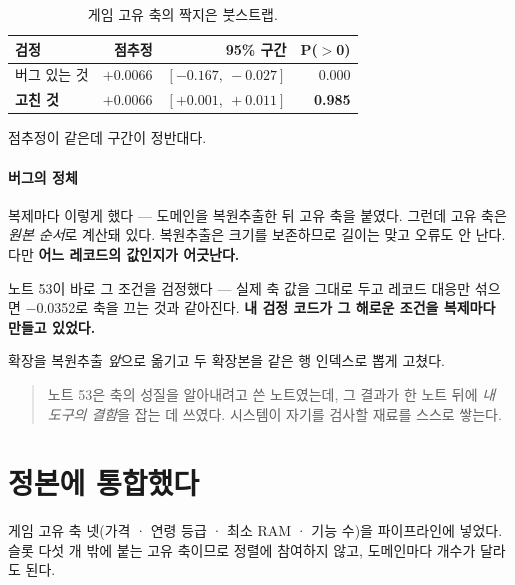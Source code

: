 \documentclass[10pt]{article}
\begin{document}
\begin{table}[t]
\centering\tsize
\caption{게임 고유 축의 짝지은 붓스트랩.}
\begin{tabular}{lrrr}
\toprule
검정 & 점추정 & 95\% 구간 & P($>$0) \\
\midrule
버그 있는 것 & $+$0.0066 & $[-0.167,\ -0.027]$ & 0.000 \\
\textbf{고친 것} & $+$0.0066 & $\mathbf{[+0.001,\ +0.011]}$ & \textbf{0.985} \\
\bottomrule
\end{tabular}
\end{table}

점추정이 같은데 구간이 정반대다.

\paragraph{버그의 정체}
복제마다 이렇게 했다 --- 도메인을 복원추출한 뒤 고유 축을 붙였다. 그런데 고유
축은 \emph{원본 순서}로 계산돼 있다. 복원추출은 크기를 보존하므로 길이는 맞고
오류도 안 난다. 다만 \textbf{어느 레코드의 값인지가 어긋난다.}

노트 53이 바로 그 조건을 검정했다 --- 실제 축 값을 그대로 두고 레코드 대응만
섞으면 $-$0.0352로 축을 끄는 것과 같아진다. \textbf{내 검정 코드가 그 해로운
조건을 복제마다 만들고 있었다.}

확장을 복원추출 \emph{앞}으로 옮기고 두 확장본을 같은 행 인덱스로 뽑게 고쳤다.


\begin{quote}\fontsize{9.5}{11.5}\selectfont
노트 53은 축의 성질을 알아내려고 쓴 노트였는데, 그 결과가 한 노트 뒤에 \emph{내
도구의 결함}을 잡는 데 쓰였다. 시스템이 자기를 검사할 재료를 스스로 쌓는다.
\end{quote}

\section{정본에 통합했다}

게임 고유 축 넷(가격 · 연령 등급 · 최소 RAM · 기능 수)을 파이프라인에 넣었다.
슬롯 다섯 개 밖에 붙는 고유 축이므로 정렬에 참여하지 않고, 도메인마다 개수가
달라도 된다.
\end{document}
